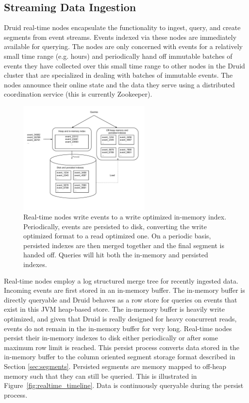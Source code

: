 \documentclass{vldb}
\begin{document}
\subsection{Streaming Data Ingestion}
Druid real-time nodes encapsulate the functionality to ingest, query, and create
segments from event streams. Events indexed via these nodes are immediately
available for querying.  The nodes are only concerned with events for a relatively
small time range (e.g. hours) and periodically hand off immutable batches of events they
have collected over this small time range to other nodes in the Druid cluster
that are specialized in dealing with batches of immutable events. The nodes
announce their online state and the data they serve using a distributed
coordination service (this is currently Zookeeper\cite{hunt2010zookeeper}).

\begin{figure}
\centering
\includegraphics[width = 2.6in]{realtime_flow} 
\caption{
Real-time nodes write events to a write optimized in-memory index.
Periodically, events are persisted to disk, converting the write optimized
format to a read optimized one. On a periodic basis, persisted indexes are
then merged together and the final segment is handed off.  Queries will hit
both the in-memory and persisted indexes.  
}
\label{fig:realtime_flow}
\end{figure}

Real-time nodes employ a log structured merge tree\cite{o1996log} for recently
ingested data. Incoming events are first stored in an in-memory buffer. The
in-memory buffer is directly queryable and Druid behaves as a row store for
queries on events that exist in this JVM heap-based store. The in-memory buffer
is heavily write optimized, and given that Druid is really designed for heavy
concurrent reads, events do not remain in the in-memory buffer for very long.
Real-time nodes persist their in-memory indexes to disk either periodically or
after some maximum row limit is reached. This persist process converts data
stored in the in-memory buffer to the column oriented segment storage format
described in Section \ref{sec:segments}.  Persisted segments are memory mapped
to off-heap memory such that they can still be queried. This is
illustrated in Figure~\ref{fig:realtime_timeline}. Data is continuously
queryable during the persist process.
\end{document}
